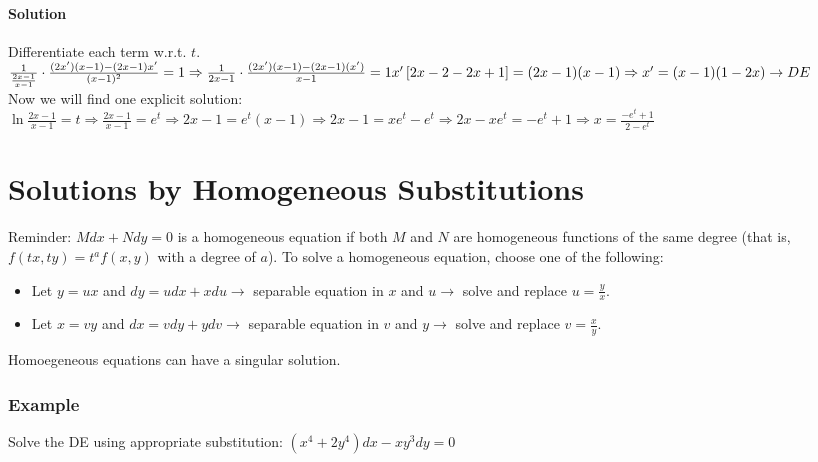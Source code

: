 \documentclass{article}
\begin{document}
\paragraph{Solution} Differentiate each term w.r.t. $t$.
\\$\frac{1}{\frac{2x-1}{x-1}}\cdot\frac{(2x')(x-1)-(2x-1)x'}{(x-1)^2}=1\Rightarrow\frac{1}{2x-1}\cdot\frac{(2x')(x-1)-(2x-1)(x')}{x-1}=1
\\x'\left[2x-2-2x+1\right]=(2x-1)(x-1)\Rightarrow x'=(x-1)(1-2x)\rightarrow DE
$
\\Now we will find one explicit solution: $\ln{\frac{2x-1}{x-1}}=t
\Rightarrow\frac{2x-1}{x-1}=e^t\Rightarrow2x-1=e^t(x-1)\Rightarrow2x-1=xe^t-e^t
\Rightarrow2x-xe^t=-e^t+1\Rightarrow x=\frac{-e^t+1}{2-e^t}$

\newpage\section{Solutions by Homogeneous Substitutions}
Reminder: $Mdx+Ndy=0$ is a homogeneous equation if both $M$ and $N$ are homogeneous functions of the same degree (that is, $f(tx,ty)=t^af(x,y)$ with a degree of $a$).
To solve a homogeneous equation, choose one of the following:
\begin{itemize}
    \itemsep 0em
    \item Let $y=ux$ and $dy=udx+xdu\to$ separable equation in $x$ and $u\to$ solve and replace $u=\frac{y}{x}$.
    \item Let $x=vy$ and $dx=vdy+ydv\to$ separable equation in $v$ and $y\to$ solve and replace $v=\frac{x}{y}$.
\end{itemize}
Homoegeneous equations can have a singular solution.

\subsubsection{Example}
Solve the DE using appropriate substitution: $(x^4+2y^4)dx-xy^3dy=0$
\end{document}
